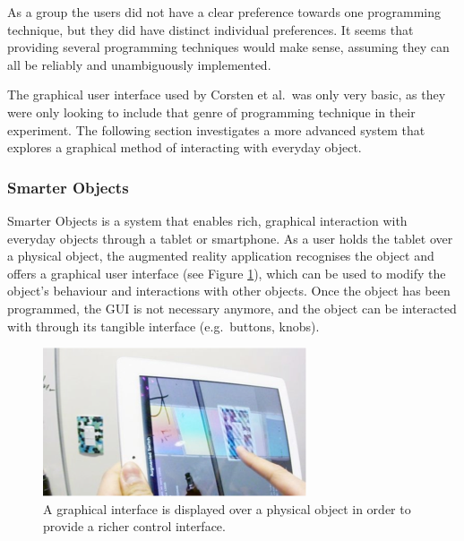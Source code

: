 As a group the users did not have a clear preference towards one programming technique, but they did have distinct individual preferences.
It seems that providing several programming techniques would make sense, assuming they can all be reliably and unambiguously implemented.

The graphical user interface used by Corsten et al.\ was only very basic, as they were only looking to include that genre of programming technique in their experiment. 
The following section investigates a more advanced system that explores a graphical method of interacting with everyday object.

\subsubsection{Smarter Objects}
\label{sec:smarterObjects}
Smarter Objects \cite{heun13smarter} is a system that enables rich, graphical interaction with everyday objects through a tablet or smartphone. 
As a user holds the tablet over a physical object, the augmented reality application recognises the object and offers a graphical user interface (see Figure \ref{fig:smarterObjectsGUI}), which can be used to modify the object's behaviour and interactions with other objects.
Once the object has been programmed, the GUI is not necessary anymore, and the object can be interacted with through its tangible interface (e.g.\ buttons, knobs).
\begin{figure}[!t]
	\centering
	\includegraphics[width=0.9\columnwidth]{Images/smarterObjectsGUI}
	\caption{A graphical interface is displayed over a physical object in order to provide a richer control interface.}
	\label{fig:smarterObjectsGUI}
\end{figure}

